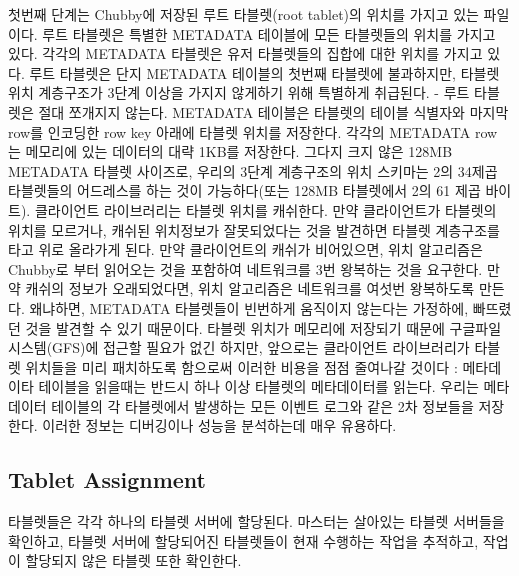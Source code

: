 \documentclass[twocolumn]{article}
\begin{document}
 첫번째 단계는 Chubby에 저장된 루트 타블렛(root tablet)의 위치를 가지고 있는 파일이다. 루트 타블렛은 특별한 METADATA 테이블에 모든 타블렛들의 위치를 가지고 있다. 각각의 METADATA 타블렛은 유저 타블렛들의 집합에 대한 위치를 가지고 있다. 루트 타블렛은 단지 METADATA 테이블의 첫번째 타블렛에 불과하지만, 타블렛 위치 계층구조가 3단계 이상을 가지지 않게하기 위해 특별하게 취급된다. - 루트 타블렛은 절대 쪼개지지 않는다.
METADATA 테이블은 타블렛의 테이블 식별자와 마지막 row를 인코딩한 row key 아래에 타블렛 위치를 저장한다. 각각의 METADATA row 는 메모리에 있는 데이터의 대략 1KB를 저장한다. 그다지 크지 않은 128MB METADATA 타블렛 사이즈로, 우리의 3단계 계층구조의 위치 스키마는 2의 34제곱 타블렛들의 어드레스를 하는 것이 가능하다(또는 128MB 타블렛에서 2의 61 제곱 바이트).
클라이언트 라이브러리는 타블렛 위치를 캐쉬한다. 만약 클라이언트가 타블렛의 위치를 모르거나, 캐쉬된 위치정보가 잘못되었다는 것을 발견하면 타블렛 계층구조를 타고 위로 올라가게 된다. 만약 클라이언트의 캐쉬가 비어있으면, 위치 알고리즘은 Chubby로 부터 읽어오는 것을 포함하여 네트워크를 3번 왕복하는 것을 요구한다. 만약 캐쉬의 정보가 오래되었다면, 위치 알고리즘은 네트워크를 여섯번 왕복하도록 만든다. 왜냐하면, METADATA 타블렛들이 빈번하게 움직이지 않는다는 가정하에, 빠뜨렸던 것을 발견할 수 있기 때문이다.  타블렛 위치가 메모리에 저장되기 때문에 구글파일시스템(GFS)에 접근할 필요가 없긴 하지만, 앞으로는 클라이언트 라이브러리가 타블렛 위치들을 미리 패치하도록 함으로써 이러한 비용을 점점 줄여나갈 것이다 : 메타데이타 테이블을 읽을때는 반드시 하나 이상 타블렛의 메타데이터를 읽는다.
우리는 메타데이터 테이블의 각 타블렛에서 발생하는 모든 이벤트 로그와 같은 2차 정보들을 저장한다. 이러한 정보는 디버깅이나 성능을 분석하는데 매우 유용하다.
 
\subsection{Tablet Assignment}
타블렛들은 각각 하나의 타블렛 서버에 할당된다. 마스터는 살아있는 타블렛 서버들을 확인하고, 타블렛 서버에 할당되어진 타블렛들이 현재 수행하는 작업을 추적하고, 작업이 할당되지 않은 타블렛 또한 확인한다.
\end{document}

